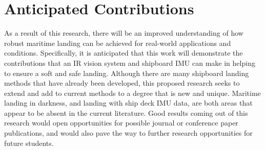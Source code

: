 \documentclass[12pt, letterpaper]{article}
\begin{document}


%

\section{Anticipated Contributions}

As a result of this research, there will be an improved understanding of how robust maritime landing can be achieved for real-world applications and conditions.  Specifically, it is anticipated that this work will demonstrate the contributions that an IR vision system and shipboard IMU can make in helping to ensure a soft and safe landing. Although there are many shipboard landing methods that have already been developed, this proposed research seeks to extend and add to current methods to a degree that is new and unique.  Maritime landing in darkness, and landing with ship deck IMU data, are both areas that appear to be absent in the current literature. Good results coming out of this research would open opportunities for possible journal or conference paper publications, and would also pave the way to further research opportunities for future students.    


\pagebreak



\end{document}
